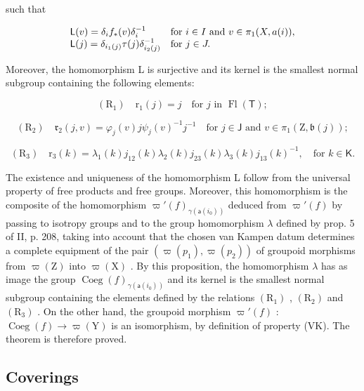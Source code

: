 such that

\[
\begin{array}{l l} \mathsf {L} (v) = \delta_ {i} f _ {*} (v) \delta_ {i} ^ {- 1} & \text {for } i\in I \text { and } v\in\pi_{1} (X,a(i)), \\ \mathsf {L} (j) = \delta_ {i _ {1} (j)} \tau (j) \delta_ {i _ {2} (j)} ^ {- 1} & \text {for } j\in J. \end{array}
\]

Moreover, the homomorphism L is surjective and its kernel is the smallest normal subgroup containing the following elements:

\[
\left(\mathrm{R} _ {1}\right) \quad \mathrm{r} _ {1} (j) = j \quad \text {for } j \text { in } \operatorname{Fl} (\mathsf {T});
\]

\[
\left(\mathrm{R} _ {2}\right) \quad \mathfrak {r} _ {2} (j, v) = \varphi_ {j} (v) j \psi_ {j} (v) ^ {- 1} j ^ {- 1} \quad \text {for } j \in \mathsf {J} \text { and } v \in \pi_ {1} (\mathrm{Z}, \mathfrak {b} (j));
\]

\[
\left(\mathrm{R} _ {3}\right) \quad \mathrm{r} _ {3} (k) = \lambda_ {1} (k) j _ {1 2} (k) \lambda_ {2} (k) j _ {2 3} (k) \lambda_ {3} (k) j _ {1 3} (k) ^ {- 1}, \quad \text {for } k \in \mathsf {K}.
\]

The existence and uniqueness of the homomorphism L follow from the universal property of free products and free groups. Moreover, this homomorphism is the composite of the homomorphism \(\varpi'(f)_{\gamma(\mathsf{a}(i_0))}\) deduced from \(\varpi'(f)\) by passing to isotropy groups and to the group homomorphism \(\lambda\) defined by prop. 5 of II, p. 208, taking into account that the chosen van Kampen datum determines a complete equipment of the pair \((\varpi(p_1), \varpi(p_2))\) of groupoid morphisms from \(\varpi(\mathrm{Z})\) into \(\varpi(\mathrm{X})\) . By this proposition, the homomorphism \(\lambda\) has as image the group \(\operatorname{Coeg}(f)_{\gamma(\mathsf{a}(i_0))}\) and its kernel is the smallest normal subgroup containing the elements defined by the relations \((\mathrm{R}_1)\) , \((\mathrm{R}_2)\) and \((\mathrm{R}_3)\) . On the other hand, the groupoid morphism \(\varpi'(f)\) : \(\operatorname{Coeg}(f) \to \varpi(\mathrm{Y})\) is an isomorphism, by definition of property (VK). The theorem is therefore proved.

\subsection{Coverings}

